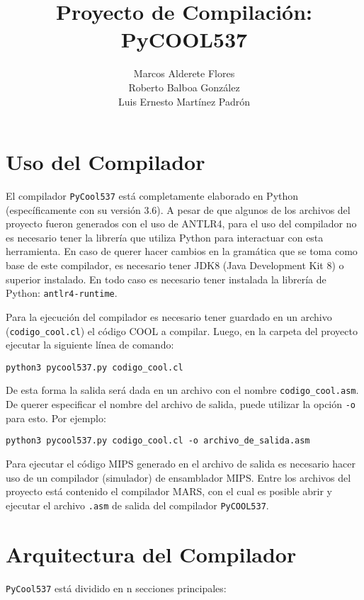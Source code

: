 \documentclass[]{article}
\title{Proyecto de Compilación:\\PyCOOL537}
\author{Marcos Alderete Flores\\
		Roberto Balboa González\\
		Luis Ernesto Martínez Padrón}
\begin{document}
	
\maketitle

\section{Uso del Compilador}
El compilador \verb|PyCool537| está completamente elaborado en Python (específicamente con su versión 3.6). A pesar de que algunos de los archivos del proyecto fueron generados con el uso de ANTLR4, para el uso del compilador no es necesario tener la librería que utiliza Python para interactuar con esta herramienta. En caso de querer hacer cambios en la gramática que se toma como base de este compilador, es necesario tener JDK8 (Java Development Kit 8) o superior instalado. En todo caso es necesario tener instalada la librería de Python: \verb|antlr4-runtime|.

Para la ejecución del compilador es necesario tener guardado en un archivo (\verb|codigo_cool.cl|) el código COOL a compilar. Luego, en la carpeta del proyecto ejecutar la siguiente línea de comando:

\verb|python3 pycool537.py codigo_cool.cl|

De esta forma la salida será dada en un archivo con el nombre \verb|codigo_cool.asm|. De querer especificar el nombre del archivo de salida, puede utilizar la opción \verb|-o| para esto. Por ejemplo:

\verb|python3 pycool537.py codigo_cool.cl -o archivo_de_salida.asm|

Para ejecutar el código MIPS generado en el archivo de salida es necesario hacer uso de un compilador (simulador) de ensamblador MIPS. Entre los archivos del proyecto está contenido el compilador MARS, con el cual es posible abrir y ejecutar el archivo \verb|.asm| de salida del compilador \verb|PyCOOL537|.

\section{Arquitectura del Compilador}
\verb|PyCool537| está dividido en n secciones principales:
\end{document}
